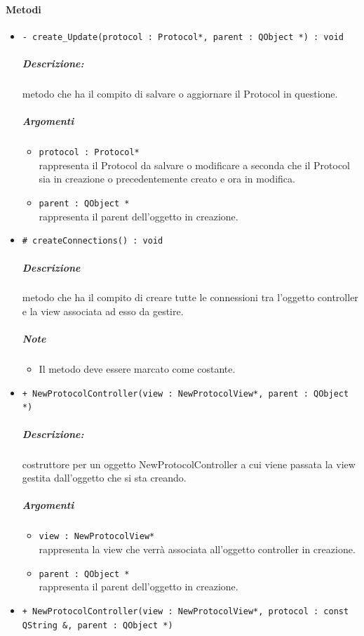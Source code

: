 	\paragraph{\color{black}Metodi}
		\begin{itemize}
			\item \color{blue} \verb!- create_Update(protocol : Protocol*, parent : QObject *) : void!
			\color{black}
			\subparagraph{Descrizione:} metodo che ha il compito di salvare o aggiornare il Protocol\g{} in questione.
			\color{black}
			\subparagraph{Argomenti}
			\begin{itemize}
				\item \color{RoyalPurple} \verb!protocol : Protocol*!\\				
\color{black} rappresenta il Protocol\g{} da salvare o modificare a seconda che il Protocol\g{} sia in creazione o precedentemente creato e ora in modifica.
				\item \color{RoyalPurple} \verb!parent : QObject *!\\				
\color{black} rappresenta il parent  dell'oggetto in creazione.
			\end{itemize}
			\item \color{blue} \verb!# createConnections() : void!
			\color{black}
			\subparagraph{Descrizione} metodo che ha il compito di creare tutte le connessioni tra l'oggetto controller e la view associata ad esso da gestire.
			\subparagraph{Note}
			\begin{itemize}
				\item Il metodo deve essere marcato come costante.
			\end{itemize}
			\item \color{blue} \verb!+ NewProtocolController(view : NewProtocolView*, parent : QObject *)!
			\color{black}
			\subparagraph{Descrizione:} costruttore per un oggetto NewProtocolController a cui viene passata la view gestita dall'oggetto che si sta creando.
			\color{black}
			\subparagraph{Argomenti}
			\begin{itemize}
				\item \color{RoyalPurple} \verb!view : NewProtocolView*!\\				
\color{black} rappresenta la view che verrà associata all'oggetto controller in creazione.
				\item \color{RoyalPurple} \verb!parent : QObject *!\\				
\color{black} rappresenta il parent dell'oggetto in creazione.
			\end{itemize}
			\item \color{blue} \verb!+ NewProtocolController(view : NewProtocolView*, protocol : const QString &, parent : QObject *)!

\end{itemize}
